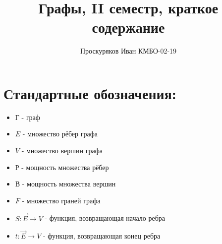 \documentclass[a4paper,12pt]{article}
\title{Графы, II семестр, краткое содержание}
\author{Проскуряков Иван КМБО-02-19}
\begin{document}
    \maketitle
    \section{Стандартные обозначения:}
        \begin{itemize}
          \item $Г$ - граф
          \item $E$ - множество рёбер графа
          \item $V$ - множество вершин графа
          \item $Р$ - мощность множества рёбер
          \item $В$ - мощность множества вершин
          \item $F$ - множество граней графа
          \item $S:\overrightarrow{E} \rightarrow V$ - функция, возвращающая начало ребра
          \item $t:\overrightarrow{E} \rightarrow V$ - функция, возвращающая конец ребра
        \end{itemize}
\end{document}
